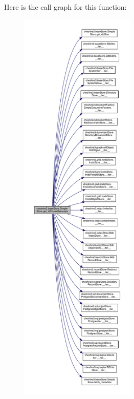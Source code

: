 Here is the call graph for this function\-:
\nopagebreak
\begin{figure}[H]
\begin{center}
\leavevmode
\includegraphics[height=550pt]{classcheshire3_1_1base_store_1_1_simple_store_a13ec15d23e0d7c4e6e7feeb04c142aa0_cgraph}
\end{center}
\end{figure}


